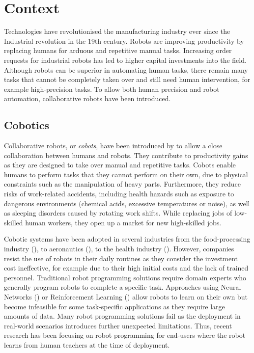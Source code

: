 \section{Context}
Technologies have revolutionised the manufacturing industry ever since the Industrial revolution in the 19th century.
Robots are improving productivity by replacing humans for arduous and repetitive manual tasks.
Increasing order requests for industrial robots has led to higher capital investments into the field.
Although robots can be superior in automating human tasks, there remain many tasks that cannot be completely taken over and still need human intervention, for example high-precision tasks.
To allow both human precision and robot automation, collaborative robots have been introduced.

\subsection{Cobotics}\label{subsec:Cobotics}
Collaborative robots, or \textit{cobots}, have been introduced by \cite{colgate1999cobots} to allow a close collaboration between humans and robots.
They contribute to productivity gains as they are designed to take over manual and repetitive tasks.
Cobots enable humans to perform tasks that they cannot perform on their own, due to physical constraints such as the manipulation of heavy parts.
Furthermore, they reduce risks of work-related accidents, including health hazards such as exposure to dangerous environments (\eg chemical acids, excessive temperatures or noise), as well as sleeping disorders caused by rotating work shifts.
While replacing jobs of low-skilled human workers, they open up a market for new high-skilled jobs.

Cobotic systems have been adopted in several industries from the food-processing industry (\cite{Food}), to aeronautics (\cite{Airbus}), to the health industry (\cite{Ebola}).
However, companies resist the use of robots in their daily routines as they consider the investment cost ineffective, for example due to their high initial costs and the lack of trained personnel.
Traditional robot programming solutions require domain experts who generally program robots to complete a specific task.
Approaches using Neural Networks (\cite{schmidhuber2015deep}) or Reinforcement Learning (\cite{gosavi2009reinforcement}) allow robots to learn on their own but become infeasible for some task-specific applications as they require large amounts of data.
Many robot programming solutions fail as the deployment in real-world scenarios introduces further unexpected limitations. 
Thus, recent research has been focusing on robot programming for end-users where the robot learns from human teachers at the time of deployment.


